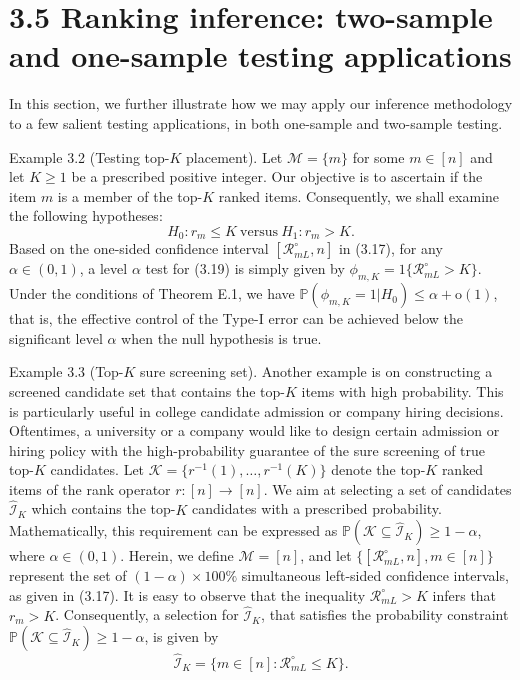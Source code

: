\section{3.5 Ranking inference: two-sample and one-sample testing applications}\label{ranking-inference-two-sample-and-one-sample-testing-applications}

In this section, we further illustrate how we may apply our inference methodology to a few salient testing applications, in both one-sample and two-sample testing.

Example 3.2 (Testing top-\(K\) placement). Let \(\mathcal{M} = \{m\}\) for some \(m \in [n]\) and let \(K \geq 1\) be a prescribed positive integer. Our objective is to ascertain if the item \(m\) is a member of the top-\(K\) ranked items. Consequently, we shall examine the following hypotheses:
\[
H_{0}:r_{m}\leq K\mathrm{~versus~}H_{1}:r_{m} > K. \tag{3.19}
\]
Based on the one-sided confidence interval \([\mathcal{R}_{mL}^{\circ}, n]\) in (3.17), for any \(\alpha \in (0,1)\), a level \(\alpha\) test for (3.19) is simply given by \(\phi_{m,K} = 1\{\mathcal{R}_{mL}^{\circ} > K\}\). Under the conditions of Theorem E.1, we have \(\mathbb{P}(\phi_{m,K} = 1|H_{0}) \leq \alpha + \mathrm{o}(1)\), that is, the effective control of the Type-I error can be achieved below the significant level \(\alpha\) when the null hypothesis is true.

Example 3.3 (Top-\(K\) sure screening set). Another example is on constructing a screened candidate set that contains the top-\(K\) items with high probability. This is particularly useful in college candidate admission or company hiring decisions. Oftentimes, a university or a company would like to design certain admission or hiring policy with the high-probability guarantee of the sure screening of true top-\(K\) candidates.
Let \(\mathcal{K} = \{r^{- 1}(1),\ldots ,r^{- 1}(K)\}\) denote the top-\(K\) ranked items of the rank operator \(r:[n]\to [n]\). We aim at selecting a set of candidates \(\widehat{\mathcal{I}}_K\) which contains the top-\(K\) candidates with a prescribed probability. Mathematically, this requirement can be expressed as \(\mathbb{P}(\mathcal{K}\subseteq \widehat{\mathcal{I}}_K)\geq 1 - \alpha\), where \(\alpha \in (0,1)\). Herein, we define \(\mathcal{M} = [n]\), and let \(\{[\mathcal{R}_{mL}^{\circ},n],m\in [n]\}\) represent the set of \((1 - \alpha)\times 100\%\) simultaneous left-sided confidence intervals, as given in (3.17). It is easy to observe that the inequality \(\mathcal{R}_{mL}^{\circ} > K\) infers that \(r_m > K\). Consequently, a selection for \(\widehat{\mathcal{I}}_K\), that satisfies the probability constraint \(\mathbb{P}(\mathcal{K}\subseteq \widehat{\mathcal{I}}_K)\geq 1 - \alpha\), is given by
\[
\widehat{\mathcal{I}}_K = \{m\in [n]:\mathcal{R}_{mL}^{\circ}\leq K\} .
\]

